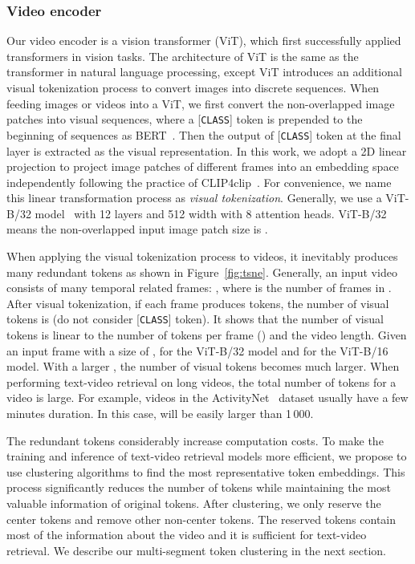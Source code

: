 \documentclass[sigconf]{acmart}
\begin{document}
\subsubsection{\textbf{Video encoder}}
Our video encoder is a vision transformer (ViT),
which first successfully applied transformers in vision tasks.
The architecture of ViT is the same as the transformer in 
natural language processing,
except ViT introduces an additional visual tokenization process to convert
images into discrete sequences.
When feeding images or videos into a ViT, we first
convert the non-overlapped image patches into visual sequences,
where a [\texttt{CLASS}] token is prepended to the beginning of sequences
as BERT~\cite{radford2019language}.
Then the output of [\texttt{CLASS}] token at the final layer is extracted
as the visual representation.
In this work, we adopt a 2D linear projection
to project image patches of different frames into an
embedding space independently
following the practice of CLIP4clip~\cite{2021clip4clip}.
For convenience, we name this linear transformation process as
\textit{visual tokenization}.
Generally, we use a ViT-B/32 model~\cite{2021-vit} with 12 layers and
512 width with 8 attention heads.
ViT-B/32 means the non-overlapped input image patch size is .

When applying the visual tokenization process to videos,
it inevitably produces many redundant tokens as shown in Figure~\ref{fig:tsne}.
Generally, an input video 
consists of many temporal related frames:
,
where  is the number of frames in .
After visual tokenization,
if each frame produces  tokens, 
the number of visual tokens is 
(do not consider [\texttt{CLASS}] token).
It shows that the number of visual tokens is linear to
the number of tokens per frame () and the video length.
Given an input frame with a size of ,
 for the ViT-B/32 model and  for the ViT-B/16 model. 
With a larger , the number of visual tokens becomes much larger.
When performing text-video retrieval on long videos,
the total number of tokens for a video is large.
For example, videos in the ActivityNet~\cite{caba2015activitynet}
dataset usually have a few minutes duration. In this case,
 will be easily larger than 1\,000.


The redundant tokens considerably increase computation costs.
To make the training and inference of text-video retrieval models more efficient,
we propose to use clustering algorithms to
find the most representative token embeddings.
This process significantly reduces the number of tokens while maintaining
the most valuable information of original tokens.
After clustering, we only reserve the center tokens and
remove other non-center tokens.
The reserved tokens contain most of the information about the video
and it is sufficient for text-video retrieval.
We describe our multi-segment token clustering in the next section.
\end{document}
